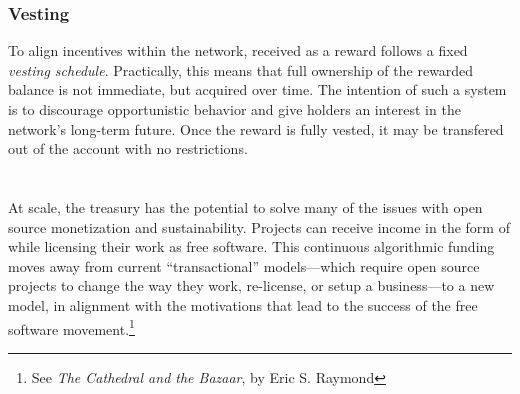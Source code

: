 \subsubsection{Vesting} To align incentives within the network, \oscoin{} received
as a reward follows a fixed \emph{vesting schedule}. Practically, this means
that full ownership of the rewarded balance is not immediate, but acquired over time. The
intention of such a system is to discourage opportunistic behavior and give \oscoin{}
holders an interest in the network's long-term future. Once the reward is
fully vested, it may be transfered out of the account with no restrictions.
\label{s:vesting}

\section*{}

\noindent At scale, the \oscoin{} treasury has the potential to solve many of
the issues with open source monetization and sustainability. Projects can
receive income in the form of \oscoin{} while licensing their work as free
software. This continuous algorithmic funding moves
away from current ``transactional'' models---which require open source projects
to change the way they work, re-license, or setup a business---to a new model,
in alignment with the motivations that lead to the success of the free software
movement.\footnote{See \emph{The Cathedral and the Bazaar}, by Eric S. Raymond}
